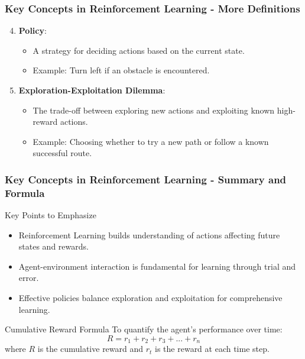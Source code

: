 \documentclass{beamer}
\begin{document}
\begin{frame}[fragile]
    \frametitle{Key Concepts in Reinforcement Learning - More Definitions}
    \begin{enumerate}
        \setcounter{enumi}{3}
        \item \textbf{Policy}:
        \begin{itemize}
            \item A strategy for deciding actions based on the current state.
            \item Example: Turn left if an obstacle is encountered.
        \end{itemize}

        \item \textbf{Exploration-Exploitation Dilemma}:
        \begin{itemize}
            \item The trade-off between exploring new actions and exploiting known high-reward actions.
            \item Example: Choosing whether to try a new path or follow a known successful route.
        \end{itemize}
    \end{enumerate}
\end{frame}

\begin{frame}[fragile]
    \frametitle{Key Concepts in Reinforcement Learning - Summary and Formula}
    \begin{block}{Key Points to Emphasize}
        \begin{itemize}
            \item Reinforcement Learning builds understanding of actions affecting future states and rewards.
            \item Agent-environment interaction is fundamental for learning through trial and error.
            \item Effective policies balance exploration and exploitation for comprehensive learning.
        \end{itemize}
    \end{block}

    \begin{block}{Cumulative Reward Formula}
        To quantify the agent's performance over time:
        \begin{equation}
            R = r_1 + r_2 + r_3 + ... + r_n
        \end{equation}
        where \( R \) is the cumulative reward and \( r_t \) is the reward at each time step.
    \end{block}
\end{frame}
\end{document}
